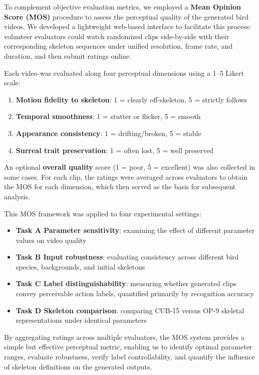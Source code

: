 \documentclass[final-report]{report-template}
\begin{document}
To complement objective evaluation metrics, we employed a \textbf{Mean Opinion Score (MOS)} procedure to assess the perceptual quality of the generated bird videos. We developed a lightweight web-based interface to facilitate this process: volunteer evaluators could watch randomized clips side-by-side with their corresponding skeleton sequences under unified resolution, frame rate, and duration, and then submit ratings online. 


Each video was evaluated along four perceptual dimensions using a 1--5 Likert scale: 
\begin{enumerate}
    \item \textbf{Motion fidelity to skeleton}: 1 = clearly off-skeleton, 5 = strictly follows
    \item \textbf{Temporal smoothness}: 1 = stutter or flicker, 5 = smooth
    \item \textbf{Appearance consistency}: 1 = drifting/broken, 5 = stable
    \item \textbf{Surreal trait preservation}: 1 = often lost, 5 = well preserved
\end{enumerate}

An optional \textbf{overall quality} score (1 = poor, 5 = excellent) was also collected in some cases. For each clip, the ratings were averaged across evaluators to obtain the MOS for each dimension, which then served as the basis for subsequent analysis.  

This MOS framework was applied to four experimental settings:
\begin{itemize}
    \item \textbf{Task A Parameter sensitivity}: examining the effect of different parameter values on video quality
    \item \textbf{Task B Input robustness}: evaluating consistency across different bird species, backgrounds, and initial skeletons
    \item \textbf{Task C Label distinguishability}: measuring whether generated clips convey perceivable action labels, quantified primarily by recognition accuracy
    \item \textbf{Task D Skeleton comparison}: comparing CUB-15 versus OP-9 skeletal representations under identical parameters
\end{itemize}

By aggregating ratings across multiple evaluators, the MOS system provides a simple but effective perceptual metric, enabling us to identify optimal parameter ranges, evaluate robustness, verify label controllability, and quantify the influence of skeleton definitions on the generated outputs.
\end{document}
